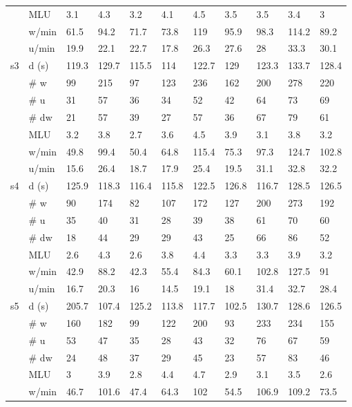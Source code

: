 \begin{screenonly}
\begin{table*}[h]
\begin{tabular*}{\hsize}{@{\extracolsep{\fill}}lllllllllll}
    & MLU & 3.1 & 4.3 & 3.2 & 4.1 & 4.5 & 3.5 & 3.5 & 3.4 & 3 \\
    & w/min & 61.5 & 94.2 & 71.7 & 73.8 & 119 & 95.9 & 98.3 & 114.2 & 89.2 \\
    & u/min & 19.9 & 22.1 & 22.7 & 17.8 & 26.3 & 27.6 & 28 & 33.3 & 30.1 \\
    \cmidrule{2-11}
    \multirow{7}{*}{s3} & d (s) & 119.3 & 129.7 & 115.5 & 114 & 122.7 & 129 & 123.3 & 133.7 & 128.4 \\
    & \# w & 99 & 215 & 97 & 123 & 236 & 162 & 200 & 278 & 220 \\
    & \# u & 31 & 57 & 36 & 34 & 52 & 42 & 64 & 73 & 69 \\
    & \# dw & 21 & 57 & 39 & 27 & 57 & 36 & 67 & 79 & 61 \\
    & MLU & 3.2 & 3.8 & 2.7 & 3.6 & 4.5 & 3.9 & 3.1 & 3.8 & 3.2 \\
    & w/min & 49.8 & 99.4 & 50.4 & 64.8 & 115.4 & 75.3 & 97.3 & 124.7 & 102.8 \\
    & u/min & 15.6 & 26.4 & 18.7 & 17.9 & 25.4 & 19.5 & 31.1 & 32.8 & 32.2 \\
    \cmidrule{2-11}
    \multirow{7}{*}{s4} & d (s) & 125.9 & 118.3 & 116.4 & 115.8 & 122.5 & 126.8 & 116.7 & 128.5 & 126.5 \\
    & \# w & 90 & 174 & 82 & 107 & 172 & 127 & 200 & 273 & 192 \\
    & \# u & 35 & 40 & 31 & 28 & 39 & 38 & 61 & 70 & 60 \\
    & \# dw & 18 & 44 & 29 & 29 & 43 & 25 & 66 & 86 & 52 \\
    & MLU & 2.6 & 4.3 & 2.6 & 3.8 & 4.4 & 3.3 & 3.3 & 3.9 & 3.2 \\
    & w/min & 42.9 & 88.2 & 42.3 & 55.4 & 84.3 & 60.1 & 102.8 & 127.5 & 91 \\
    & u/min & 16.7 & 20.3 & 16 & 14.5 & 19.1 & 18 & 31.4 & 32.7 & 28.4 \\
    \cmidrule{2-11}
    \multirow{7}{*}{s5} & d (s) & 205.7 & 107.4 & 125.2 & 113.8 & 117.7 & 102.5 & 130.7 & 128.6 & 126.5 \\
    & \# w & 160 & 182 & 99 & 122 & 200 & 93 & 233 & 234 & 155 \\
    & \# u & 53 & 47 & 35 & 28 & 43 & 32 & 76 & 67 & 59 \\
    & \# dw & 24 & 48 & 37 & 29 & 45 & 23 & 57 & 83 & 46 \\
    & MLU & 3 & 3.9 & 2.8 & 4.4 & 4.7 & 2.9 & 3.1 & 3.5 & 2.6 \\
    & w/min & 46.7 & 101.6 & 47.4 & 64.3 & 102 & 54.5 & 106.9 & 109.2 & 73.5 \\

\end{tabular*}
\end{table*}
\end{screenonly}
